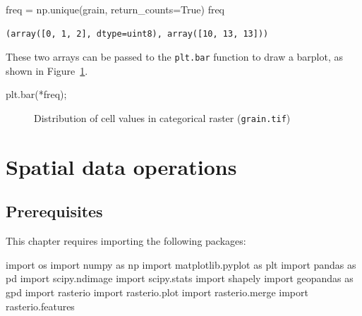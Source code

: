 \documentclass[
  letterpaper,
]{krantz}
\newenvironment{Shaded}{\begin{snugshade}}{\end{snugshade}}
\newcommand{\ImportTok}[1]{\textcolor[rgb]{0.00,0.46,0.62}{#1}}
\newcommand{\NormalTok}[1]{\textcolor[rgb]{0.00,0.23,0.31}{#1}}
\newcommand{\OperatorTok}[1]{\textcolor[rgb]{0.37,0.37,0.37}{#1}}
\newcommand{\VariableTok}[1]{\textcolor[rgb]{0.07,0.07,0.07}{#1}}
\begin{document}
\begin{Shaded}
\begin{Highlighting}[]
\NormalTok{freq }\OperatorTok{=}\NormalTok{ np.unique(grain, return\_counts}\OperatorTok{=}\VariableTok{True}\NormalTok{)}
\NormalTok{freq}
\end{Highlighting}
\end{Shaded}

\begin{verbatim}
(array([0, 1, 2], dtype=uint8), array([10, 13, 13]))
\end{verbatim}

These two arrays can be passed to the \texttt{plt.bar} function to draw
a barplot, as shown in Figure~\ref{fig-raster-bar}.

\begin{Shaded}
\begin{Highlighting}[]
\NormalTok{plt.bar(}\OperatorTok{*}\NormalTok{freq)}\OperatorTok{;}
\end{Highlighting}
\end{Shaded}

\begin{figure}[H]


\caption{\label{fig-raster-bar}Distribution of cell values in
categorical raster (\texttt{grain.tif})}

\end{figure}%


\chapter{Spatial data operations}\label{sec-spatial-operations}

\section*{Prerequisites}\label{prerequisites-2}


This chapter requires importing the following packages:

\begin{Shaded}
\begin{Highlighting}[]
\ImportTok{import}\NormalTok{ os}
\ImportTok{import}\NormalTok{ numpy }\ImportTok{as}\NormalTok{ np}
\ImportTok{import}\NormalTok{ matplotlib.pyplot }\ImportTok{as}\NormalTok{ plt}
\ImportTok{import}\NormalTok{ pandas }\ImportTok{as}\NormalTok{ pd}
\ImportTok{import}\NormalTok{ scipy.ndimage}
\ImportTok{import}\NormalTok{ scipy.stats}
\ImportTok{import}\NormalTok{ shapely}
\ImportTok{import}\NormalTok{ geopandas }\ImportTok{as}\NormalTok{ gpd}
\ImportTok{import}\NormalTok{ rasterio}
\ImportTok{import}\NormalTok{ rasterio.plot}
\ImportTok{import}\NormalTok{ rasterio.merge}
\ImportTok{import}\NormalTok{ rasterio.features}
\end{Highlighting}
\end{Shaded}
\end{document}
